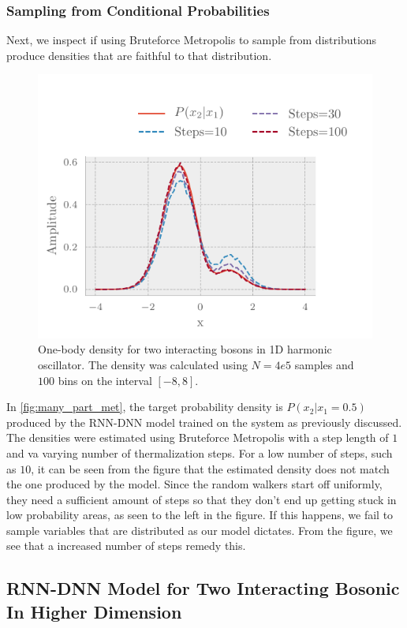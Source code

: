 \subsubsection{Sampling from Conditional Probabilities}
Next, we inspect if using Bruteforce Metropolis to sample from distributions produce densities that are faithful to that distribution.

\begin{figure}[H]
	\includegraphics[]{figures/many_part_met.pdf}
	\caption{One-body density for two interacting bosons in 1D harmonic oscillator. The density was calculated using $N=4e5$ samples and $100$ bins on the interval $[-8,8]$.}
	\label{fig:many_part_met}
\end{figure}

In \autoref{fig:many_part_met}, the target probability density is $P(x_2|x_1=0.5)$ produced by the RNN-DNN model trained on the system as previously discussed. The densities were estimated using Bruteforce Metropolis with a step length of $1$ and va varying number of thermalization steps. For a low number of steps, such as $10$, it can be seen from the figure that the estimated density does not match the one produced by the model. Since the random walkers start off uniformly, they need a sufficient amount of steps so that they don't end up getting stuck in low probability areas, as seen to the left in the figure. If this happens, we fail to sample variables that are distributed as our model dictates. From the figure, we see that a increased number of steps remedy this.  

\subsection{RNN-DNN Model for Two Interacting Bosonic In Higher Dimension}

